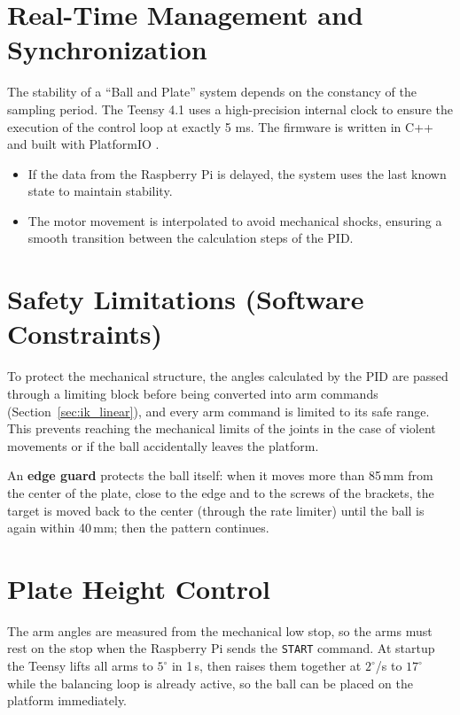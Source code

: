 \documentclass[12pt,a4paper]{report}
\begin{document}
\section{Real-Time Management and Synchronization}
The stability of a ``Ball and Plate'' system depends on the constancy of the sampling period. The Teensy 4.1 uses a high-precision internal clock to ensure the execution of the control loop at exactly 5 ms. The firmware is written in C++ and built with PlatformIO \cite{platformio}.
\begin{itemize}
    \item If the data from the Raspberry Pi is delayed, the system uses the last known state to maintain stability.
    \item The motor movement is interpolated to avoid mechanical shocks, ensuring a smooth transition between the calculation steps of the PID.
\end{itemize}

\section{Safety Limitations (Software Constraints)}
To protect the mechanical structure, the angles calculated by the PID are passed through a limiting block before being converted into arm commands (Section~\ref{sec:ik_linear}), and every arm command is limited to its safe range. This prevents reaching the mechanical limits of the joints in the case of violent movements or if the ball accidentally leaves the platform.

An \textbf{edge guard} protects the ball itself: when it moves more than 85\,mm from the center of the plate, close to the edge and to the screws of the brackets, the target is moved back to the center (through the rate limiter) until the ball is again within 40\,mm; then the pattern continues.

\section{Plate Height Control}
\label{sec:height_control}

The arm angles are measured from the mechanical low stop, so the arms must rest on the stop when the Raspberry Pi sends the \texttt{START} command. At startup the Teensy lifts all arms to $5^\circ$ in 1\,s, then raises them together at $2^\circ$/s to $17^\circ$ while the balancing loop is already active, so the ball can be placed on the platform immediately.
\end{document}

